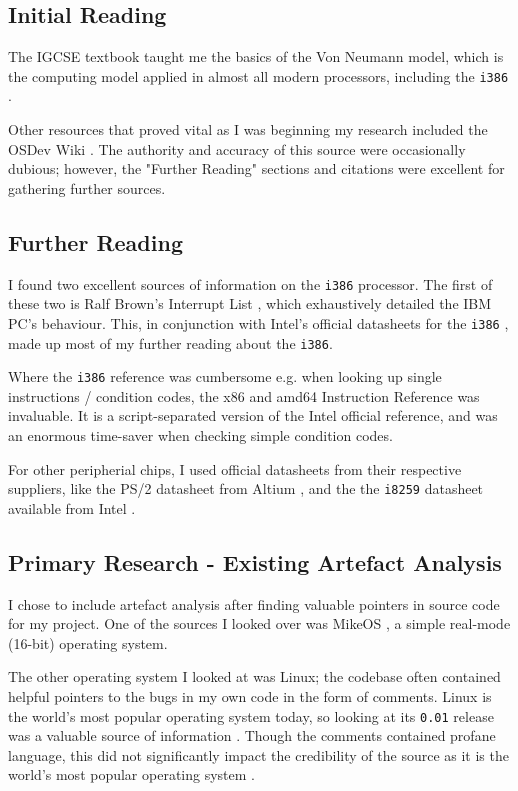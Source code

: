 \documentclass[a4paper,12pt]{article}
\begin{document}
\subsection{Initial Reading}

The IGCSE textbook taught me the basics of the Von Neumann model, which is the computing model applied in almost all modern processors, including the \texttt{i386}  \citep{igcse_textbook}.

Other resources that proved vital as I was beginning my research included the OSDev Wiki \citep{osdev-wiki}. The authority and accuracy of this source were occasionally dubious; however, the "Further Reading" sections and citations were excellent for gathering further sources. 

\subsection{Further Reading}

I found two excellent sources of information on the \texttt{i386} processor. The first of these two is Ralf Brown's Interrupt List \citep{rbil}, which exhaustively detailed the IBM PC's behaviour. This, in conjunction with Intel's official datasheets for the \texttt{i386} \citep{i386_datasheet}, made up most of my further reading about the \texttt{i386}. 

Where the \texttt{i386} reference was cumbersome e.g. when looking up single instructions / condition codes, the x86 and amd64 Instruction Reference \citep{x86_reference} was invaluable. It is a script-separated version of the Intel official reference, and was an enormous time-saver when checking simple condition codes. 

For other peripherial chips, I used official datasheets from their respective suppliers, like the PS/2 datasheet from Altium \citep{ps2_reference}, and the the \texttt{i8259} datasheet available from Intel \citep{i8259_datasheet}. 

\subsection{Primary Research - Existing Artefact Analysis}

I chose to include artefact analysis after finding valuable pointers in source code for my project. One of the sources I looked over was MikeOS \citep{mikeos}, a simple real-mode (16-bit) operating system.


The other operating system I looked at was Linux; the codebase often contained helpful pointers to the bugs in my own code in the form of comments. Linux is the world's most popular operating system today, so looking at its \texttt{0.01} release was a valuable source of information \citep{linux}. Though the comments contained profane language, this did not significantly impact the credibility of the source as it is the world's most popular operating system \citep{linux_adoption}. 
\end{document}

